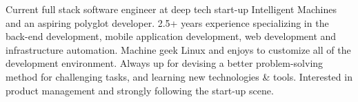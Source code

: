 

\begin{cvparagraph}

Current full stack software engineer at deep tech start-up Intelligent Machines and an aspiring polyglot developer. 2.5+ years experience specializing in the back-end development, mobile application development, web development and infrastructure automation. Machine geek Linux and enjoys to customize all of the development environment. Always up for devising a better problem-solving method for challenging tasks, and learning new technologies \& tools. Interested in product management and strongly following the start-up scene.
\end{cvparagraph}

